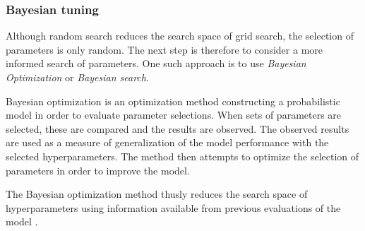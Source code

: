 \subsubsection{Bayesian tuning}

Although random search reduces the search space of grid search, the selection of parameters is only random.
The next step is therefore to consider a more informed search of parameters.
One such approach is to use \textit{Bayesian Optimization} or \textit{Bayesian search}.

Bayesian optimization is an optimization method constructing a probabilistic model in order to evaluate parameter selections.
When sets of parameters are selected, these are compared and the results are observed.
The observed results are used as a measure of generalization of the model performance with the selected hyperparameters.
The method then attempts to optimize the selection of parameters in order to improve the model.

The Bayesian optimization method thusly reduces the search space of hyperparameters using information available from previous evaluations of the model
\cite{Snoek2012}.
